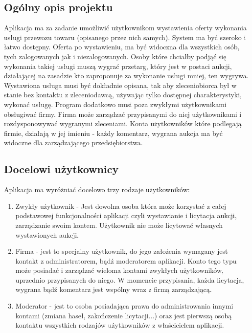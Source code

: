 \documentclass[10pt,titlepage]{article} %
\begin{document}
\subsection{Ogólny opis projektu}\label{ogolny opis projektu}
Aplikacja ma za zadanie umożliwić użytkownikom wystawienia oferty wykonania usługi przewozu towaru (opisanego przez nich samych). System ma być szeroko i łatwo dostępny. Oferta po wystawieniu, ma być widoczna dla wszystkich osób, tych zalogowanych jak i niezalogowanych. Osoby które chciałby podjąć się wykonania takiej usługi muszą wygrać przetarg, który jest w postaci aukcji, działającej na zasadzie kto zaproponuje za wykonanie usługi mniej, ten wygrywa. Wystawiona usługa musi być dokładnie opisana, tak aby zleceniobiorca był w stanie bez kontaktu z zleceniodawcą, używając tylko dostępnej charakterystyki, wykonać usługę. \mbox\\
Program dodatkowo musi poza zwykłymi użytkownikami obsługiwać firmy. Firma może zarządzać przypisanymi do niej użytkownikami i rozdysponowywać wygranymi zleceniami. Konta użytkowników które podlegają firmie, działają w jej imieniu - każdy komentarz, wygrana aukcja ma być widoczne dla zarządzającego przedsiębiorstwa.


\subsection{Docelowi użytkownicy}
Aplikacja ma wyróżniać docelowo trzy rodzaje użytkowników:
\begin{enumerate}[1.]
\item Zwykły użytkownik - Jest dowolna osoba która może korzystać z całej podstawowej funkcjonalności aplikacji czyli wystawianie i licytacja aukcji, zarządzanie swoim kontem. Użytkownik nie może licytować własnych wystawionych aukcji. 
\item Firma - jest to specjalny użytkownik, do jego założenia wymagany jest kontakt z administratorem, bądź moderatorem aplikacji. Konto tego typu może posiadać i zarządzać wieloma kontami zwykłych użytkowników, uprzednio przypisanych do niego. W momencie przypisania, każda licytacja, wygrana bądź komentarz jest wspólny wraz z firmą zarządzającą. 
\item Moderator - jest to osoba posiadająca prawa do administrowania innymi kontami (zmiana haseł, zakończenie licytacji...) oraz jest pierwszą osobą kontaktu wszystkich rodzajów użytkowników z właścicielem aplikacji.
\end{enumerate}
\end{document}
